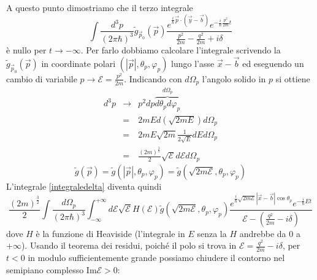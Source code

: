 \documentclass[../../FisicaTeorica.tex]{subfiles}
\begin{document}
A questo punto dimostriamo che il terzo integrale
\begin{equation}
  \label{integraledelta} \int \frac{d^3 p}{(2 \pi \hbar)^3} 
  \tilde{g}_{\vec{p}_0} (\vec{p}) \frac{e^{\frac{i}{\hbar}  \vec{p} \cdot
  (\vec{y} - \vec{b})} e^{- \frac{i}{\hbar}  \frac{p^2}{2 m} t}}{\frac{p^2}{2
  m} - \frac{q^2}{2 m} + i \delta}
\end{equation}
{\`e} nullo per $t \rightarrow - \infty$. Per farlo dobbiamo calcolare
l'integrale scrivendo la $\tilde{g}_{\vec{p}_0} (\vec{p})$ in coordinate
polari $(| \vec{p} |, \theta_p, \varphi_p)$ lungo l'asse $\vec{x} - \vec{b}$
ed eseguendo un cambio di variabile $p \to \mathcal{E}= \frac{p^2}{2 m}$.
Indicando con $d \Omega_p$ l'angolo solido in $p$ si ottiene
\begin{eqnarray*}
  d^3 p & \rightarrow & p^2 d p \overbrace{d \theta_p d \varphi_p}^{d
  \Omega_p}\\
  & = & 2 m E d \left( \sqrt{2 m E} \right) d \Omega_p\\
  & = & 2 m E  \sqrt{2 m}  \frac{1}{2 \sqrt{E}} d E d \Omega_p\\
  & = & \frac{(2 m)^{\frac{3}{2}}}{2} \sqrt{\mathcal{E}} d\mathcal{E}d
  \Omega_p
\end{eqnarray*}
\[ \tilde{g} (\vec{p}) = \tilde{g} (| \vec{p} |, \theta_p, \varphi_p) =
   \tilde{g} (\sqrt{2 m\mathcal{E}}, \theta_p, \varphi_p) \]
L'integrale {\eqref{integraledelta}} diventa quindi
\[ \frac{(2 m)^{\frac{3}{2}}}{2}  \int \frac{d \Omega_p}{(2 \pi \hbar)^3} 
   \int_{- \infty}^{+ \infty} d\mathcal{E} \sqrt{\mathcal{E}} H (\mathcal{E})
   \tilde{g} (\sqrt{2 m\mathcal{E}}, \theta_p, \varphi_p)
   \frac{e^{\frac{i}{\hbar} \sqrt{2 m\mathcal{E}} | \vec{x} - \vec{b} | \cos
   \theta_p} e^{- \frac{i}{\hbar} E t} }{\mathcal{E}- \left( \frac{q^2}{2 m} -
   i \delta \right)} \]
dove $H$ {\`e} la funzione di Heaviside (l'integrale in $E$ senza la $H$
andrebbe da $0$ a $+ \infty$). Usando il teorema dei residui, poich{\'e} il
polo si trova in $\mathcal{E}= \frac{q^2}{2 m} - i \delta$, per $t < 0$ in
modulo sufficientemente grande possiamo chiudere il contorno nel semipiano
complesso Im$\mathcal{E}> 0$:
\end{document}
